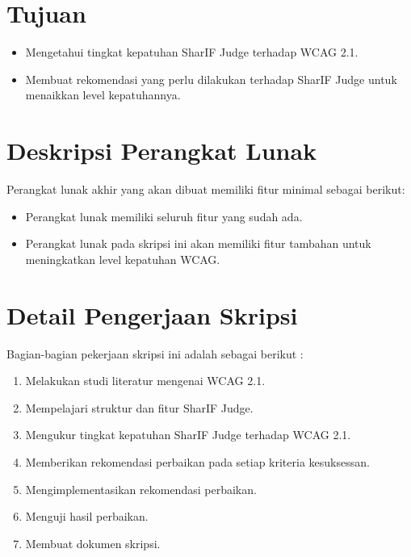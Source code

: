 \documentclass[a4paper,twoside]{article}
\begin{document}
\section{Tujuan}
\begin{itemize}
	\item Mengetahui tingkat kepatuhan SharIF Judge terhadap WCAG 2.1.
	\item Membuat rekomendasi yang perlu dilakukan terhadap SharIF Judge untuk menaikkan level kepatuhannya.
\end{itemize}                         

\section{Deskripsi Perangkat Lunak}
Perangkat lunak akhir yang akan dibuat memiliki fitur minimal sebagai berikut:
\begin{itemize}
	\item Perangkat lunak memiliki seluruh fitur yang sudah ada.
	\item Perangkat lunak pada skripsi ini akan memiliki fitur tambahan untuk meningkatkan level kepatuhan WCAG.
\end{itemize}

\section{Detail Pengerjaan Skripsi}
Bagian-bagian pekerjaan skripsi ini adalah sebagai berikut :
	\begin{enumerate}
		\item Melakukan studi literatur mengenai WCAG 2.1.
		\item Mempelajari struktur dan fitur SharIF Judge.
		\item Mengukur tingkat kepatuhan SharIF Judge terhadap WCAG 2.1.
		\item Memberikan rekomendasi perbaikan pada setiap kriteria kesuksessan.
		\item Mengimplementasikan rekomendasi perbaikan.
		\item Menguji hasil perbaikan.
		\item Membuat dokumen skripsi.
	\end{enumerate}
\end{document}
